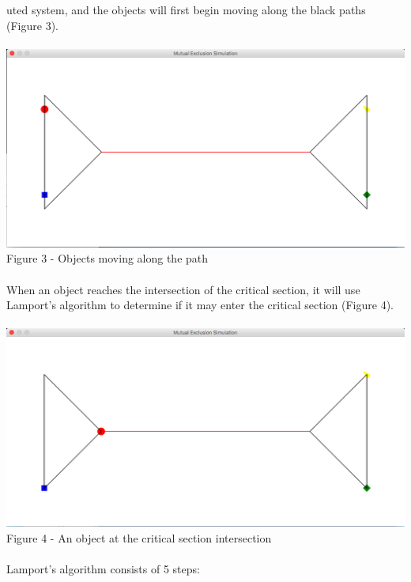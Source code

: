 \documentclass [11pt] {article}
\begin{document}
uted system, and the objects will first begin moving along the black paths (Figure 3).\\\\ \includegraphics [scale = .5] {Figure3}\\ Figure 3 - Objects moving along the path\\\\  When an object reaches the intersection of the critical section, it will use Lamport's algorithm to determine if it may enter the critical section (Figure 4).\\\\  \includegraphics [scale = .5] {Figure4}\\ Figure 4 - An object at the critical section intersection\\\\  Lamport's algorithm consists of 5 steps:
\end{document}
